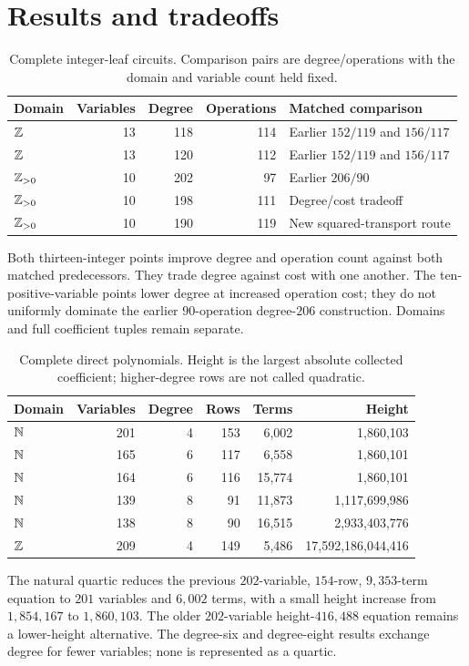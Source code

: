 \section{Results and tradeoffs}
\begin{table}[ht]
\centering\small
\begin{tabular}{lrrrl}
\toprule
Domain & Variables & Degree & Operations & Matched comparison\\
\midrule
$\mathbb Z$ &13&118&114&Earlier $152/119$ and $156/117$\\
$\mathbb Z$ &13&120&112&Earlier $152/119$ and $156/117$\\
$\mathbb Z_{>0}$ &10&202&97&Earlier $206/90$\\
$\mathbb Z_{>0}$ &10&198&111&Degree/cost tradeoff\\
$\mathbb Z_{>0}$ &10&190&119&New squared-transport route\\
\bottomrule
\end{tabular}
\caption{Complete integer-leaf circuits. Comparison pairs are
 degree/operations with the domain and variable count held fixed.}
\end{table}
Both thirteen-integer points improve degree and operation count against
both matched predecessors. They trade degree against cost with one another.
The ten-positive-variable points lower degree at increased operation cost;
they do not uniformly dominate the earlier $90$-operation degree-$206$
construction. Domains and full coefficient tuples remain separate.

\begin{table}[ht]
\centering\small
\begin{tabular}{lrrrrr}
\toprule
Domain & Variables & Degree & Rows & Terms & Height\\
\midrule
$\mathbb N$ &201&4&153&6,002&1,860,103\\
$\mathbb N$ &165&6&117&6,558&1,860,101\\
$\mathbb N$ &164&6&116&15,774&1,860,101\\
$\mathbb N$ &139&8&91&11,873&1,117,699,986\\
$\mathbb N$ &138&8&90&16,515&2,933,403,776\\
$\mathbb Z$ &209&4&149&5,486&17,592,186,044,416\\
\bottomrule
\end{tabular}
\caption{Complete direct polynomials. Height is the largest absolute
collected coefficient; higher-degree rows are not called quadratic.}
\end{table}
The natural quartic reduces the previous $202$-variable, $154$-row,
$9{,}353$-term equation to $201$ variables and $6{,}002$ terms, with a small
height increase from $1{,}854{,}167$ to $1{,}860{,}103$. The older
$202$-variable height-$416{,}488$ equation remains a lower-height alternative.
The degree-six and degree-eight results exchange degree for fewer variables;
none is represented as a quartic.

